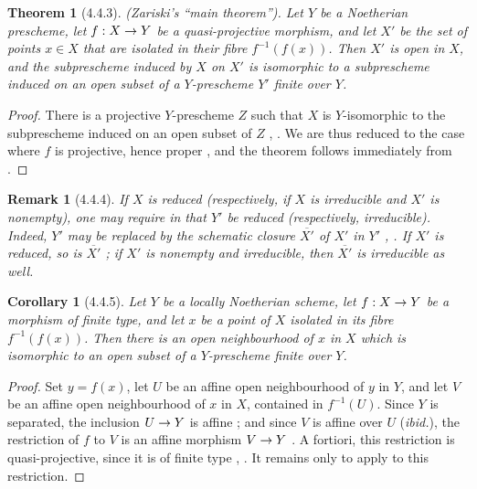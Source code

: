 \documentclass[oneside]{amsart}
\theoremstyle{ega-env-style}
\theoremstyle{ega-thm-env-style}
\newtheorem*{theorem}{Theorem}
\newtheorem*{corollary}{Corollary}
\theoremstyle{ega-defn-env-style}
\newtheorem*{remark}{Remark}
\renewcommand{\to}{\mathchoice{\longrightarrow}{\rightarrow}{\rightarrow}{\rightarrow}}
\let\EGAOriginalLabel\label
\renewcommand{\label}[1]{\phantomsection\EGAOriginalLabel{#1}}
\begin{document}
\begin{theorem}[4.4.3]
\label{III.4.4.3}
\textnormal{(Zariski's ``main theorem'').}
Let $Y$ be a Noetherian prescheme, let $f:X\to Y$ be a
quasi-projective morphism, and let $X'$ be the set of points $x\in X$
that are isolated in their fibre $f^{-1}(f(x))$.  Then $X'$ is open
in $X$, and the subprescheme induced by $X$ on $X'$ is isomorphic to
a subprescheme induced on an open subset of a $Y$-prescheme $Y'$
finite over $Y$.
\end{theorem}

\begin{proof}
There is a projective $Y$-prescheme $Z$ such that $X$ is
$Y$-isomorphic to the subprescheme induced on an open subset of $Z$
, .  We are thus reduced to
the case where $f$ is projective, hence proper
, and the theorem follows immediately from
.
\end{proof}

\begin{remark}[4.4.4]
\label{III.4.4.4}
If $X$ is reduced (respectively, if $X$ is irreducible and $X'$ is
nonempty), one may require in  that $Y'$ be reduced
(respectively, irreducible).  Indeed, $Y'$ may be replaced by the
schematic closure $\overline{X'}$ of $X'$ in $Y'$
, .  If $X'$ is reduced, so is
$\overline{X'}$ ; if $X'$ is nonempty and
irreducible, then $\overline{X'}$ is irreducible as well.
\end{remark}

\begin{corollary}[4.4.5]
\label{III.4.4.5}
Let $Y$ be a locally Noetherian scheme, let $f:X\to Y$ be a morphism
of finite type, and let $x$ be a point of $X$ isolated in its fibre
$f^{-1}(f(x))$.  Then there is an open neighbourhood of $x$ in $X$
which is isomorphic to an open subset of a $Y$-prescheme finite over
$Y$.
\end{corollary}

\begin{proof}
Set $y=f(x)$, let $U$ be an affine open neighbourhood of $y$ in $Y$,
and let $V$ be an affine open neighbourhood of $x$ in $X$, contained
in $f^{-1}(U)$.  Since $Y$ is separated, the inclusion $U\to Y$ is
affine ; and since $V$ is affine over $U$
(\emph{ibid.}), the restriction of $f$ to $V$ is an affine morphism
$V\to Y$ .  A fortiori, this restriction is
quasi-projective, since it is of finite type
, .  It remains only to apply
 to this restriction.
\end{proof}
\end{document}
